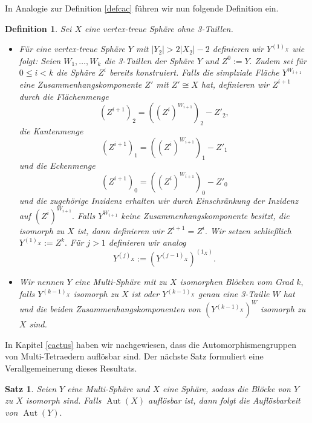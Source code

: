 \documentclass[12pt,titlepage,twoside,cleardoublepage]{article}
\theoremstyle{nummermitklammern}
\newtheorem{definition}[temp]{Definition}
\newtheorem{satz}[temp]{Satz}
\newtheorem{definition}[zahl]{Definition}
\newtheorem{satz}[zahl]{Satz}
\numberwithin{equation}{section}
\DeclareMathOperator{\Aut}{Aut}
\begin{document}
In Analogie zur Definition \ref{defcac} führen wir nun folgende Definition ein.
\begin{definition}
Sei $X$ eine vertex-treue Sphäre ohne 3-Taillen.
\begin{itemize}
\item Für eine vertex-treue Sphäre $Y$ mit $\vert Y_2 \vert > 2\vert X_2 \vert-2$ definieren wir $Y^{(1)_X}$ wie folgt:
Seien $W_1,\ldots,W_k$ die 3-Taillen der Sphäre $Y$ und $Z^0:=Y.$ 
Zudem sei für $0\leq i < k$ die Sphäre $Z^i$ bereits konstruiert.
Falls die simplziale Fläche $Y^{W_{i+1}}$ eine Zusammenhangskomponente $Z'$ mit $Z'\cong X$ hat, definieren wir $Z^{i+1}$ durch die Flächenmenge 
\[
(Z^{i+1})_2=((Z^{i})^{W_{i+1}})_2-Z'_2,
\]
die Kantenmenge
\[
(Z^{i+1})_1=((Z^{i})^{W_{i+1}})_1-Z'_1
\]
und die Eckenmenge 
\[
(Z^{i+1})_0=((Z^{i})^{W_{i+1}})_0-Z'_0
\]
und die zugehörige Inzidenz erhalten wir durch Einschränkung der Inzidenz auf $(Z^{i})^{W_{i+1}}.$
Falls $Y^{W_{i+1}}$ keine Zusammenhangskomponente besitzt, die isomorph zu $X$ ist, dann definieren wir $Z^{i+1}=Z^i.$ Wir setzen schließlich $Y^{(1)_X}:=Z^{k}.$ 
Für $j>1$ definieren wir analog 
\[
Y^{(j)_X}:={(Y^{(j-1)_X})}^{(1_X)}.
\]
\item Wir nennen $Y$ eine Multi-Sphäre mit zu $X$ isomorphen Blöcken vom Grad $k,$ falls $Y^{(k-1)_X}$ isomorph zu $X$ ist oder $Y^{(k-1)_X}$ genau eine 3-Taille $W$ hat und die beiden Zusammenhangskomponenten von $(Y^{(k-1)_X})^W$ isomorph zu $X$ sind.
\end{itemize}
\end{definition}
In Kapitel \ref{cactus} haben wir nachgewiesen, dass die Automorphismengruppen von Multi-Tetraedern auflösbar sind. Der nächste Satz formuliert eine Verallgemeinerung dieses Resultats. 
\begin{satz}\label{aufl}
Seien $Y$ eine Multi-Sphäre und $X$ eine Sphäre, sodass die Blöcke von $Y$ zu $X$ isomorph sind. Falls $\Aut(X)$ auflösbar ist, dann folgt die Auflösbarkeit von $\Aut(Y).$ 
\end{satz}
\end{document}
